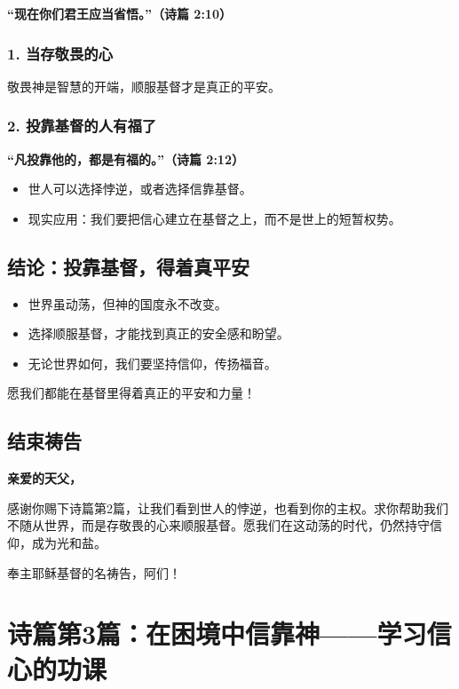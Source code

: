 \documentclass[a4paper, 12pt]{article}
\begin{document}
\textbf{“现在你们君王应当省悟。”（诗篇 2:10）}

\subsubsection*{1. 当存敬畏的心}
敬畏神是智慧的开端，顺服基督才是真正的平安。

\subsubsection*{2. 投靠基督的人有福了}
\textbf{“凡投靠他的，都是有福的。”（诗篇 2:12）}

\begin{itemize}
    \item 世人可以选择悖逆，或者选择信靠基督。
    \item 现实应用：我们要把信心建立在基督之上，而不是世上的短暂权势。
\end{itemize}

\subsection*{结论：投靠基督，得着真平安}

\begin{itemize}
    \item 世界虽动荡，但神的国度永不改变。
    \item 选择顺服基督，才能找到真正的安全感和盼望。
    \item 无论世界如何，我们要坚持信仰，传扬福音。
\end{itemize}

愿我们都能在基督里得着真正的平安和力量！

\subsection*{结束祷告}

\textbf{亲爱的天父，}

感谢你赐下诗篇第2篇，让我们看到世人的悖逆，也看到你的主权。求你帮助我们不随从世界，而是存敬畏的心来顺服基督。愿我们在这动荡的时代，仍然持守信仰，成为光和盐。

奉主耶稣基督的名祷告，阿们！


\newpage
\section{诗篇第3篇：在困境中信靠神——学习信心的功课}
\end{document}
